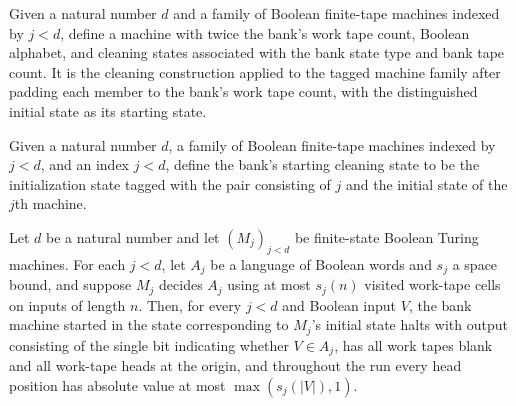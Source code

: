 \begin{definition}
\label{Complexity.LogProg.bankTM}
\leanok
{}
Given a natural number $d$ and a family of Boolean finite-tape machines indexed by
$j<d$, define a machine with twice the bank's work tape count, Boolean alphabet, and
cleaning states associated with the bank state type and bank tape count. It is the
cleaning construction applied to the tagged machine family after padding each member to
the bank's work tape count, with the distinguished initial state as its starting state.
\end{definition}

\begin{definition}
\label{Complexity.LogProg.bankStart}
\leanok
{}
Given a natural number $d$, a family of Boolean finite-tape machines indexed by $j<d$,
and an index $j<d$, define the bank's starting cleaning state to be the initialization
state tagged with the pair consisting of $j$ and the initial state of the $j$th machine.
\end{definition}

\begin{theorem}
\label{Complexity.LogProg.bank_cleanRun}
\leanok
{}
Let $d$ be a natural number and let $(M_j)_{j<d}$ be finite-state Boolean Turing
machines. For each $j<d$, let $A_j$ be a language of Boolean words and $s_j$ a space
bound, and suppose $M_j$ decides $A_j$ using at most $s_j(n)$ visited work-tape cells on
inputs of length $n$. Then, for every $j<d$ and Boolean input $V$, the bank machine
started in the state corresponding to $M_j$'s initial state halts with output consisting
of the single bit indicating whether $V\in A_j$, has all work tapes blank and all
work-tape heads at the origin, and throughout the run every head position has absolute
value at most $\max(s_j(|V|),1)$.
\end{theorem}
